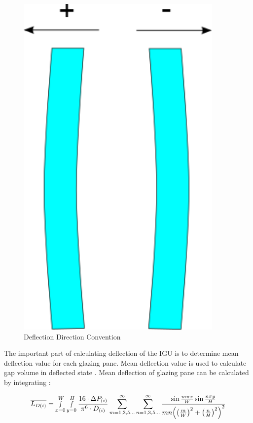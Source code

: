 \begin{figure}[hbtp] %
\centering
\includegraphics[width=0.9\textwidth, height=0.9\textheight, keepaspectratio=true]{media/image1787.png}
\caption{Deflection Direction Convention \protect \label{fig:deflection-direction-convention}}
\end{figure}

The important part of calculating deflection of the IGU is to determine mean deflection value for each glazing pane. Mean deflection value is used to calculate gap volume in deflected state . Mean deflection of glazing pane can be calculated by integrating :

\begin{equation}
\overline {{L_{D\left( i \right)}}}  = \mathop \smallint \limits_{x = 0}^W \mathop \smallint \limits_{y = 0}^H \frac{{16\cdot \Delta {P_{\left( i \right)}}}}{{{\pi ^6}\cdot {D_{\left( i \right)}}}}\mathop \sum \limits_{m = 1,3,5 \ldots }^\infty  \mathop \sum \limits_{n = 1,3,5 \ldots }^\infty  \frac{{\sin \frac{{m\pi x}}{W}\sin \frac{{n\pi y}}{H}}}{{mn{{\left( {{{\left( {\frac{m}{W}} \right)}^2} + {{\left( {\frac{n}{H}} \right)}^2}} \right)}^2}}}
\end{equation}

